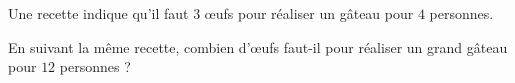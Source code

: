 
Une recette indique qu'il faut $3$ œufs pour réaliser un gâteau pour $4$ personnes.

En suivant la même recette, combien d'œufs faut-il pour réaliser un grand gâteau pour $12$ personnes ?

\smallskip
{}
